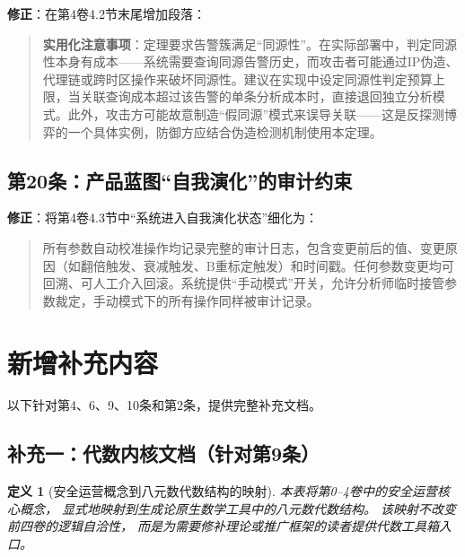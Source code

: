 \documentclass[11pt,a4paper]{article}
\newtheorem{definition}{定义}[section]
\begin{document}
\textbf{修正}：在第4卷4.2节末尾增加段落：
\begin{quote}
\textbf{实用化注意事项}：定理要求告警簇满足“同源性”。在实际部署中，判定同源性本身有成本——系统需要查询同源告警历史，而攻击者可能通过IP伪造、代理链或跨时区操作来破坏同源性。建议在实现中设定同源性判定预算上限，当关联查询成本超过该告警的单条分析成本时，直接退回独立分析模式。此外，攻击方可能故意制造“假同源”模式来误导关联——这是反探测博弈的一个具体实例，防御方应结合伪造检测机制使用本定理。
\end{quote}

\subsection{第20条：产品蓝图“自我演化”的审计约束}

\textbf{修正}：将第4卷4.3节中“系统进入自我演化状态”细化为：
\begin{quote}
所有参数自动校准操作均记录完整的审计日志，包含变更前后的值、变更原因（如翻倍触发、衰减触发、B重标定触发）和时间戳。任何参数变更均可回溯、可人工介入回滚。系统提供“手动模式”开关，允许分析师临时接管参数裁定，手动模式下的所有操作同样被审计记录。
\end{quote}

\section{新增补充内容}

以下针对第4、6、9、10条和第2条，提供完整补充文档。

\subsection{补充一：代数内核文档（针对第9条）}

\begin{definition}[安全运营概念到八元数代数结构的映射]
本表将第0--4卷中的安全运营核心概念，
显式地映射到生成论原生数学工具中的八元数代数结构。
该映射不改变前四卷的逻辑自洽性，
而是为需要修补理论或推广框架的读者提供代数工具箱入口。
\end{definition}
\end{document}
